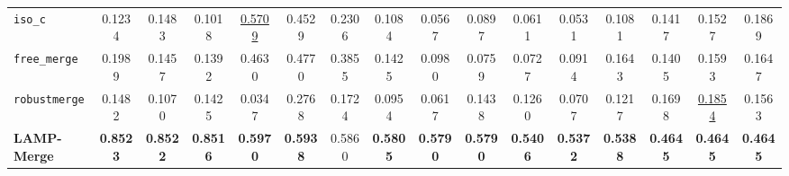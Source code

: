 \documentclass[letterpaper]{article} %
\begin{document}
\begin{table}[t]
{\begin{tabular}{lccccccccccccccc}
\texttt{iso\_c} & 0.1234 & 0.1483 & 0.1018 & \underline{0.5709} & 0.4529 & 0.2306 & 0.1084 & 0.0567 & 0.0897 & 0.0611 & 0.0531 & 0.1081 & 0.1417 & 0.1527 & 0.1869 \\
\texttt{free\_merge} & 0.1989 & 0.1457 & 0.1392 & 0.4630 & 0.4770 & 0.3855 & 0.1425 & 0.0980 & 0.0759 & 0.0727 & 0.0914 & 0.1643 & 0.1405 & 0.1593 & 0.1647 \\
\texttt{robustmerge} & 0.1482 & 0.1070 & 0.1425 & 0.0347 & 0.2768 & 0.1724 & 0.0954 & 0.0617 & 0.1438 & 0.1260 & 0.0707 & 0.1217 & 0.1698 & \underline{0.1854} & 0.1563 \\
\textbf{LAMP-Merge} & \textbf{0.8523} & \textbf{0.8522} & \textbf{0.8516} & \textbf{0.5970} & \textbf{0.5938} & 0.5860 & \textbf{0.5805} & \textbf{0.5790} & \textbf{0.5790} & \textbf{0.5406} & \textbf{0.5372} & \textbf{0.5388} & \textbf{0.4645} & \textbf{0.4645} & \textbf{0.4645} \\
\hline
\end{tabular}
}
\end{table}
\end{document}
